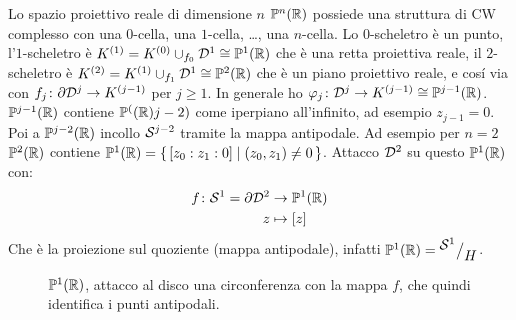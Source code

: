 \begin{example}
  Lo spazio proiettivo reale di dimensione $ n $ $ \mathbb{P}^{n} (\mathbb{R}) $ possiede una
  struttura di CW complesso con una $ 0 $-cella, una $ 1 $-cella, \dots, una
  $ n $-cella. Lo $ 0 $-scheletro è un punto, l'$ 1 $-scheletro è
  $ K^{(1)} = K^{(0)} \cup_{f_0} \mathcal{D}^{1} \cong \mathbb{P}^{1} (\mathbb{R}) $ che è una retta proiettiva
  reale, il $ 2 $-scheletro è
  $ K^{(2)} = K^{(1)} \cup_{f_1} \mathcal{D}^{1} \cong \mathbb{P}^{2} (\mathbb{R}) $ che è un piano proiettivo
  reale, e cosí via con $ f_j \colon \partial \mathcal{D}^{j} \to K^{(j-1)} $ per
  $ j \geq 1 $. In generale ho
  $ \varphi_j \colon \mathcal{D}^{j} \to K^{(j-1)} \cong \mathbb{P}^{j-1} (\mathbb{R}) $. $ \mathbb{P}^{j-1} (\mathbb{R}) $ contiene
  $ \mathbb{P}^{(} (\mathbb{R})j-2) $ come iperpiano all'infinito, ad esempio $ z_{j-1} = 0 $. Poi a
  $ \mathbb{P}^{j-2} (\mathbb{R}) $ incollo $ \mathcal{S}^{j-2} $ tramite la mappa antipodale. Ad esempio
  per $ n = 2 $ $ \mathbb{P}^{2} (\mathbb{R}) $ contiene
  $ \mathbb{P}^{1} (\mathbb{R}) = \set{ [z_0 : z_1 : 0] | (z_0, z_1) \not = 0 } $. Attacco
  $ \mathcal{D}^{2} $ su questo $ \mathbb{P}^{1} (\mathbb{R}) $ con:
  \begin{align*}
    f \colon \mathcal{S}^{1} = \partial \mathcal{D}^{2} & \to \mathbb{P}^{1} (\mathbb{R}) \\
    z & \mapsto [z]
  \end{align*}
  Che è la proiezione sul quoziente (mappa antipodale), infatti
  $ \mathbb{P}^{1} (\mathbb{R}) = {^{\textstyle \mathcal{S}^{1}}\big/_{\textstyle H}} $. %
  \begin{figure}[htbp]
    \centering
    \caption{$ \mathbb{P}^{1} (\mathbb{R}) $, attacco al disco una circonferenza con la mappa $ f $,
      che quindi identifica i punti antipodali.}
    \label{fig:lez10:projective}
  \end{figure}
\end{example}

